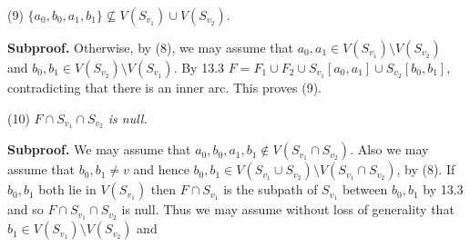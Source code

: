 \hspace*{12pt}(9) $\{a_0, b_0, a_1, b_1\} \nsubseteq V(S_{v_1}) \cup V(S_{v_2})$.

\textbf{Subproof.} Otherwise, by (8), we may assume that $a_0, a_1 \in V(S_{v_1}) \setminus V(S_{v_2})$ and $b_0, b_1 \in V(S_{v_2}) \setminus V(S_{v_1})$. By 13.3 $F = F_1 \cup F_2 \cup S_{v_1}[a_0, a_1] \cup S_{v_2}[b_0, b_1]$, contradicting that there is an inner arc. This proves (9).

\hspace*{12pt}(10) $F \cap S_{v_1} \cap S_{v_2}$ \textit{is null.}

\textbf{Subproof.} We may assume that $a_0, b_0, a_1, b_1 \notin V(S_{v_1} \cap S_{v_2})$. Also we may assume that $b_0, b_1 \ne v$ and hence $b_0, b_1 \in V(S_{v_1} \cup S_{v_2}) \setminus V(S_{v_1} \cap S_{v_2})$, by (8). If $b_0, b_1$ both lie in $V(S_{v_1})$ then $F \cap S_{v_1}$ is the subpath of $S_{v_1}$ between $b_0, b_1$ by 13.3 and so $F \cap S_{v_1} \cap S_{v_2}$ is null. Thus we may assume without loss of generality that $b_1 \in V(S_{v_1}) \setminus V(S_{v_2})$ and
